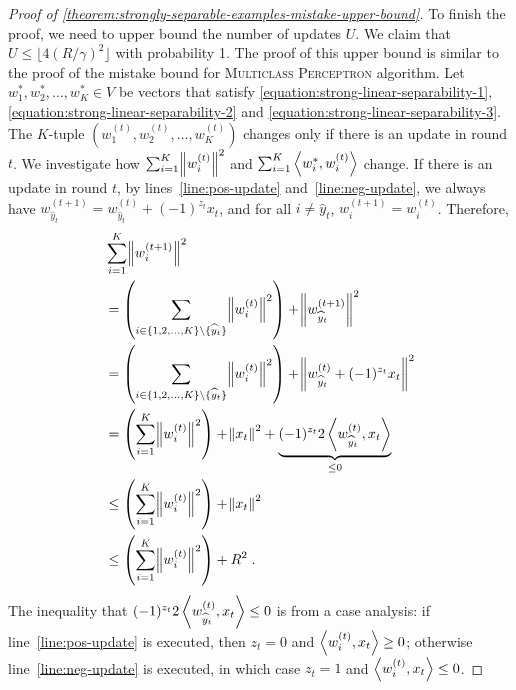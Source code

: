 \begin{proof}[Proof of \autoref{theorem:strongly-separable-examples-mistake-upper-bound}]
To finish the proof, we need to upper bound the number of updates $U$. We claim
that $U \le \lfloor 4(R/\gamma)^2 \rfloor$ with probability 1.
The proof of this upper bound is
similar to the proof of the mistake bound for \textsc{Multiclass Perceptron}
algorithm. Let $w_1^*, w_2^*, \dots, w_K^* \in V$ be vectors that satisfy
\eqref{equation:strong-linear-separability-1},
\eqref{equation:strong-linear-separability-2} and
\eqref{equation:strong-linear-separability-3}.
The $K$-tuple $(w_1^{(t)}, w_2^{(t)}, \dots, w_K^{(t)})$
changes only if there is an update in round $t$.
We investigate how $\sum_{i=1}^K \norm{w_i^{(t)}}^2$ and
$\sum_{i=1}^K \left\langle w_i^*, w_i^{(t)} \right\rangle$ change. If there is an update in round $t$,
by lines~\ref{line:pos-update} and~\ref{line:neg-update}, we always have
$ w_{\widehat y_t}^{(t+1)} = w_{\widehat y_t}^{(t)} + (-1)^{z_t} x_t $,
and for all $i \neq \widehat y_t$, $w_{i}^{(t+1)} = w_{i}^{(t)}$.
Therefore,
\begingroup
\allowdisplaybreaks
\begin{align*}
& \sum_{i=1}^K \norm{w_i^{(t+1)}}^2 \\
& = \left( \sum_{i \in \{1,2,\dots,K\} \setminus \{\widehat y_t\}} \norm{w_i^{(t)}}^2 \right) + \norm{w_{\widehat y_t}^{(t+1)}}^2 \\
& = \left( \sum_{i \in \{1,2,\dots,K\} \setminus \{\widehat y_t\}} \norm{w_i^{(t)}}^2 \right) + \norm{w_{\widehat y_t}^{(t)} + (-1)^{z_t} x_t}^2 \\
& = \left( \sum_{i=1}^K \norm{w_i^{(t)}}^2 \right) + \norm{x_t}^2 + \underbrace{(-1)^{z_t} 2 \left\langle w_{\widehat y_t}^{(t)}, x_t \right\rangle}_{\le 0} \\
& \le \left( \sum_{i=1}^K \norm{w_i^{(t)}}^2 \right) + \norm{x_t}^2 \\
& \le \left( \sum_{i=1}^K \norm{w_i^{(t)}}^2 \right) + R^2 \; .
\end{align*}
\endgroup
The inequality that $(-1)^{z_t} 2 \left\langle w_{\widehat y_t}^{(t)}, x_t \right\rangle \leq 0$ is from a case analysis: if line~\ref{line:pos-update} is executed, then $z_t = 0$ and $\left\langle w_i^{(t)}, x_t \right\rangle \ge 0$; otherwise line~\ref{line:neg-update} is executed, in which case $z_t = 1$ and $\left\langle w_i^{(t)}, x_t \right\rangle \le 0$.



\end{proof}
